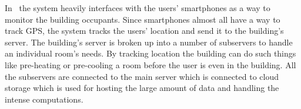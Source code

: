 \documentclass[letterpaper,12pt]{article}   %
\begin{document}
In~\cite{Pan2015} the system heavily interfaces with the users' smartphones as a way to monitor the building occupants. Since smartphones almost all have a way to track GPS, the system tracks the users' location and send it to the building's server. The building's server is broken up into a number of subservers to handle an individual room's needs. By tracking location the building can do such things like pre-heating or pre-cooling a room before the user is even in the building. All the subservers are connected to the main server which is connected to cloud storage which is used for hosting the large amount of data and handling the intense computations.
\end{document}
